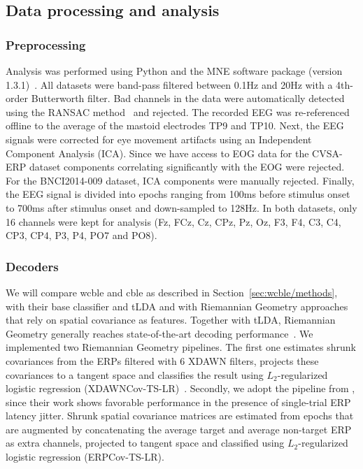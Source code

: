 \subsection{Data processing and analysis}
\subsubsection{Preprocessing}
Analysis was performed using Python and the MNE software package (version
1.3.1)~\cite{Gramfort2013}.
All datasets were band-pass filtered between 0.1Hz and 20Hz with a 4th-order Butterworth filter.
Bad channels in the data were automatically detected using the RANSAC
method~\cite{Fischler1981} and rejected.
The recorded EEG was re-referenced
offline to the average of the mastoid electrodes TP9 and TP10.
Next, the EEG signals were corrected for eye movement artifacts using an
Independent Component Analysis (ICA).
Since we have access to EOG data for the CVSA-ERP dataset components correlating
significantly with the EOG were rejected.
For the BNCI2014-009 dataset, ICA components were manually rejected.
Finally, the EEG signal is divided into epochs ranging from 100ms before stimulus onset to 700ms after stimulus onset and down-sampled to 128Hz.
In both datasets, only 16 channels were kept for
analysis (Fz, FCz, Cz, CPz, Pz, Oz, F3, F4, C3, C4, CP3, CP4, P3, P4, PO7 and
PO8).

\subsubsection{Decoders}
We will compare \ac{wcble} and \ac{cble} as described in
Section~\ref{sec:wcble/methods}, with their base classifier and tLDA and with
Riemannian Geometry
approaches that rely on spatial covariance as features.
Together with tLDA, Riemannian Geometry generally reaches state-of-the-art decoding
performance~\cite{Lotte2018}.
We implemented two Riemannian Geometry pipelines.
The first one estimates shrunk covariances from the ERPs filtered with 6 XDAWN
filters, projects these covariances to a tangent space and classifies the
result using $L_2$-regularized logistic regression
(XDAWNCov-TS-LR)~\cite{Cecotti2017}.
Secondly, we adopt the pipeline from \cite{Aydarkhanov2020}, since their work shows
favorable performance in the presence of single-trial ERP latency jitter.
Shrunk spatial covariance matrices are estimated from epochs that are
augmented by concatenating the average target and average non-target ERP as
extra channels, projected to tangent space and classified using
$L_2$-regularized logistic regression (ERPCov-TS-LR).

